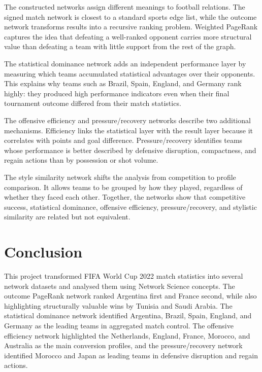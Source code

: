 \documentclass[10pt,twocolumn]{article}
\begin{document}
The constructed networks assign different meanings to football relations. The signed match network is closest to a standard sports edge list, while the outcome network transforms results into a recursive ranking problem. Weighted PageRank captures the idea that defeating a well-ranked opponent carries more structural value than defeating a team with little support from the rest of the graph.

The statistical dominance network adds an independent performance layer by measuring which teams accumulated statistical advantages over their opponents. This explains why teams such as Brazil, Spain, England, and Germany rank highly: they produced high performance indicators even when their final tournament outcome differed from their match statistics.

The offensive efficiency and pressure/recovery networks describe two additional mechanisms. Efficiency links the statistical layer with the result layer because it correlates with points and goal difference. Pressure/recovery identifies teams whose performance is better described by defensive disruption, compactness, and regain actions than by possession or shot volume.

The style similarity network shifts the analysis from competition to profile comparison. It allows teams to be grouped by how they played, regardless of whether they faced each other. Together, the networks show that competitive success, statistical dominance, offensive efficiency, pressure/recovery, and stylistic similarity are related but not equivalent.

\section{Conclusion}

This project transformed FIFA World Cup 2022 match statistics into several network datasets and analysed them using Network Science concepts. The outcome PageRank network ranked Argentina first and France second, while also highlighting structurally valuable wins by Tunisia and Saudi Arabia. The statistical dominance network identified Argentina, Brazil, Spain, England, and Germany as the leading teams in aggregated match control. The offensive efficiency network highlighted the Netherlands, England, France, Morocco, and Australia as the main conversion profiles, and the pressure/recovery network identified Morocco and Japan as leading teams in defensive disruption and regain actions.
\end{document}

